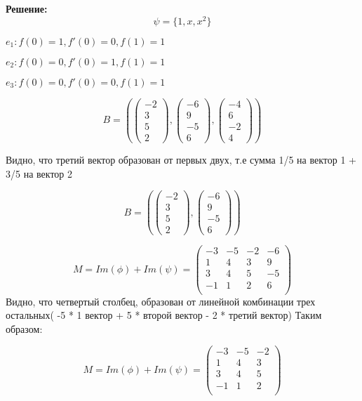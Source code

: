 \documentclass[a4paper,12pt]{article}
\begin{document}
\textbf{Решение:}
\[
\psi = \{1, x, x^2\}
\]

$e_1: f(0) = 1, f'(0)=0, f(1) = 1$

$e_2: f(0)=0, f'(0)=1, f(1) = 1$

$e_3: f(0) = 0, f'(0)=0, f(1)=1$

\[
B = \left(\begin{pmatrix}
    -2 \\ 3 \\ 5 \\ 2
\end{pmatrix}, \begin{pmatrix}
    -6 \\ 9 \\ -5 \\ 6
\end{pmatrix}, \begin{pmatrix}
    -4 \\ 6 \\ -2 \\ 4
\end{pmatrix} \right)
\]

Видно, что третий вектор образован от первых двух, т.е сумма 1/5 на вектор 1 + 3/5 на вектор 2

\[
B = \left(\begin{pmatrix}
    -2 \\ 3 \\ 5 \\ 2
\end{pmatrix}, \begin{pmatrix}
    -6 \\ 9 \\ -5 \\ 6
\end{pmatrix}\right)
\]

\[
M = Im(\phi) + Im(\psi)  = \begin{pmatrix}
    -3& -5& -2& -6 \\
    1& 4& 3& 9 \\
    3& 4& 5& -5 \\
    -1& 1& 2& 6 \\
\end{pmatrix}
\]
Видно, что четвертый столбец, образован от линейной комбинации трех остальных( -5 * 1 вектор + 5 * второй вектор - 2 * третий вектор) Таким образом:

\[
M = Im(\phi) + Im(\psi)  = \begin{pmatrix}
    -3& -5& -2 \\
    1& 4& 3 \\
    3& 4& 5 \\
    -1& 1& 2 \\
\end{pmatrix}
\]
\end{document}
